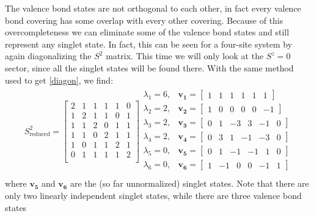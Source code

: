 The valence bond states are not orthogonal to each other, in fact every valence bond covering
has some overlap with every other covering.
Because of this overcompleteness we can eliminate some of the valence bond states and still
represent any singlet state.  
In fact, this can be seen for a four-site system by again diagonalizing the $S^2$ matrix.
This time we will only look at the $S^z=0$ sector, since all the singlet states will be found there.
With the same method used to get \eqref{diagon}, we find:
\begin{eqnarray}
S^2_{\text{reduced}} =\left[
\begin{array}{cccccc}
2&1&1&1&1&0\\
1&2&1&1&0&1\\
1&1&2&0&1&1\\
1&1&0&2&1&1\\
1&0&1&1&2&1\\
0&1&1&1&1&2\\
\end{array} \right] 
\begin{array}{cl}
\lambda_1=6,&\mathbf{v_1} =\left[\begin{array}{cccccc} 1&1&1&1&1&1\end{array} \right]\\
\lambda_2=2,&\mathbf{v_2} =\left[\begin{array}{cccccc} 1&0&0&0&0&-1\end{array} \right]\\
\lambda_3=2,&\mathbf{v_3} =\left[\begin{array}{cccccc} 0&1&-3&3&-1&0\end{array} \right]\\
\lambda_4=2,&\mathbf{v_4} =\left[\begin{array}{cccccc} 0&3&1&-1&-3&0\end{array} \right]\\
\lambda_5=0,&\mathbf{v_5} =\left[\begin{array}{cccccc} 0&1&-1&-1&1&0\end{array} \right]\\
\lambda_6=0,&\mathbf{v_6} =\left[\begin{array}{cccccc} 1&-1&0&0&-1&1\end{array} \right]\\
\end{array} 
\end{eqnarray}
where $\mathbf{v_5}$ and $\mathbf{v_6}$ are the (so far unnormalized) singlet states.
Note that there are only two linearly independent singlet states, while there are three valence bond states
